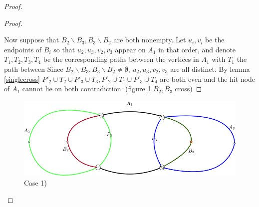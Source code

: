 \documentclass[letterpaper,11pt]{article}
\newtheorem{lemma}[theorem]{Lemma}
\newcommand{\0}{\mathbb{0}}
\newcommand{\1}{\mathbb{1}}
\begin{document}
\begin{proof}
\begin{proof}
\begin{figure}
    \label{disjointPicont}
\end{figure}
Now suppose that $ B_2 \backslash B_3 , B_3 \backslash B_2$ are both nonempty. Let $u_i, v_i$ be the endpoints of $ B_i $ so that $ u_2 , u_3 , v_2 , v_3 $  appear on $A_1$ in that order, and denote $ T_1, T_2, T_3, T_4 $ be the corresponding paths between the vertices in $A_1$ with $T_1$ the path between  Since $ B_2 \backslash B_3 , B_3 \backslash B_2 \neq \emptyset$, $ u_2 , u_3 , v_2 , v_3 $  are all distinct. By lemma \ref{singlecross}  $ P'_2 \cup T_2 \cup P'_3 \cup T_3, P'_2 \cup T_1 \cup P'_3 \cup T_4 $ are both even and the hit node of $A_1$ cannot lie on both contradiction. (figure \ref{disjointPicont} $B_2 ,B_3$ cross)
\end{proof}

\begin{figure}[h]
        \includegraphics[scale=0.3]{Case1.png}
    \caption{Case 1)}
\end{figure} 

\end{proof}
\end{document}
